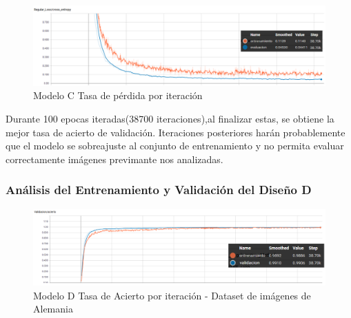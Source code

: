 			
			\begin{figure}[H]
				\begin{center}
				\includegraphics[width=1\textwidth]{images/desarrollo/trainResults/model4Loss} 
				\end{center}
				\begin{center}
				\caption{\small{Modelo C Tasa de pérdida por iteración}}
				\vspace{-1em}
				{\small{\fontsize{10}{16.8}\selectfont {Fuente propia}}}
				\end{center}
				\vspace{-1.5em}
			\end{figure}

			Durante 100 epocas iteradas(38700 iteraciones),al finalizar estas, se obtiene la mejor tasa de acierto de validación. Iteraciones posteriores harán probablemente que el modelo se sobreajuste al conjunto de entrenamiento y no permita evaluar correctamente imágenes previmante nos analizadas.

		\subsubsection{Análisis del Entrenamiento y Validación del Diseño D} 
			\begin{figure}[H]
				\begin{center}
				\includegraphics[width=1\textwidth]{images/desarrollo/trainResults/model6Acierto} 
				\end{center}
				\begin{center}
				\caption{\small{Modelo D Tasa de Acierto por iteración - Dataset de imágenes de Alemania  }}
				\vspace{-1em}
				{\small{\fontsize{10}{16.8}\selectfont {Fuente propia}}}
				\end{center}
				\vspace{-1.5em}
			\end{figure}
			

